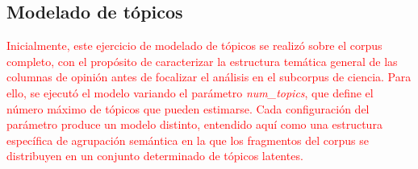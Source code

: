 \documentclass[11pt,a4paper]{article}
\begin{document}
	\subsection{Modelado de tópicos}
%		
%		
%		


\textcolor{red}{Inicialmente, este ejercicio de modelado de tópicos se realizó sobre el corpus completo, con el propósito de caracterizar la estructura temática general de las columnas de opinión antes de focalizar el análisis en el subcorpus de ciencia. Para ello, se ejecutó el modelo variando el parámetro \textit{num\_topics}, que define el número máximo de tópicos que pueden estimarse. Cada configuración del parámetro produce un modelo distinto, entendido aquí como una estructura específica de agrupación semántica en la que los fragmentos del corpus se distribuyen en un conjunto determinado de tópicos latentes.}
\end{document}
